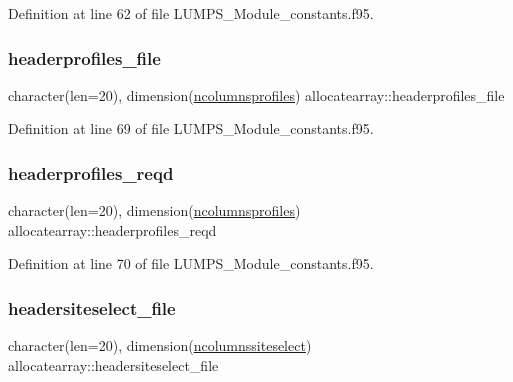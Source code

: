 Definition at line 62 of file L\+U\+M\+P\+S\+\_\+\+Module\+\_\+constants.\+f95.

\mbox{\label{namespaceallocatearray_ab80c29dab9c61373913b3adab5decbc9}} 
\subsubsection{\texorpdfstring{headerprofiles\+\_\+file}{headerprofiles\_file}}
{\footnotesize\ttfamily character(len=20), dimension(\hyperlink{namespaceallocatearray_a505dab229d9725bdbe44d06de37dceba}{ncolumnsprofiles}) allocatearray\+::headerprofiles\+\_\+file}



Definition at line 69 of file L\+U\+M\+P\+S\+\_\+\+Module\+\_\+constants.\+f95.

\mbox{\label{namespaceallocatearray_a54f6a31f434560c3e13bd7835a1bffd8}} 
\subsubsection{\texorpdfstring{headerprofiles\+\_\+reqd}{headerprofiles\_reqd}}
{\footnotesize\ttfamily character(len=20), dimension(\hyperlink{namespaceallocatearray_a505dab229d9725bdbe44d06de37dceba}{ncolumnsprofiles}) allocatearray\+::headerprofiles\+\_\+reqd}



Definition at line 70 of file L\+U\+M\+P\+S\+\_\+\+Module\+\_\+constants.\+f95.

\mbox{\label{namespaceallocatearray_ad113ac656f4ca34ffd377081c3d86d54}} 
\subsubsection{\texorpdfstring{headersiteselect\+\_\+file}{headersiteselect\_file}}
{\footnotesize\ttfamily character(len=20), dimension(\hyperlink{namespaceallocatearray_a0fc6d13698e2122d715ea6e5758194d9}{ncolumnssiteselect}) allocatearray\+::headersiteselect\+\_\+file}



